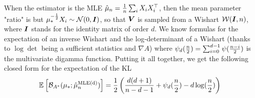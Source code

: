 \documentclass{article}
\newcommand*{\expect}[2][]{\ensuremath{\mathbb{E}_{#1} \left[ #2 \right] }} %
\newcommand{\logpart}{A}
\newcommand{\bregmanconj}{\cB_{\logpart^*}}
\begin{document}
When the estimator is the MLE $\hat \mu_n = \inv{n} \sum_i X_i X_i^\top$, 
then the mean parameter "ratio" is
but $\mu_*^{-\half}X_i \sim \cN(0,\mI)$, so that $\mV$
is sampled from a Wishart  $\cW(\mI, n)$, where $\mI$ stands for the identity matrix of order $d$. 
We know formulas for the expectation of an inverse Wishart and the log-determinant of a Wishart (thanks to $\log\det$ being a sufficient statistics and $\nabla\logpart$)
where $\psi_d(\half[n]) = \sum_{i=0}^{d-1} \psi ( \half[n - i])$ is the multivariate digamma function.
Putting it all together, we get the following closed form for the expectation of the KL
 \begin{align}
 	\expect{\bregmanconj( \mu_*; \hat \mu_n^\text{MLE(d)})}
 	= \half \left ( \frac{d(d+1)}{n-d-1} + \psi_d(\half[n]) - d \log(\half[n])  \right )
 \end{align}
\end{document}
